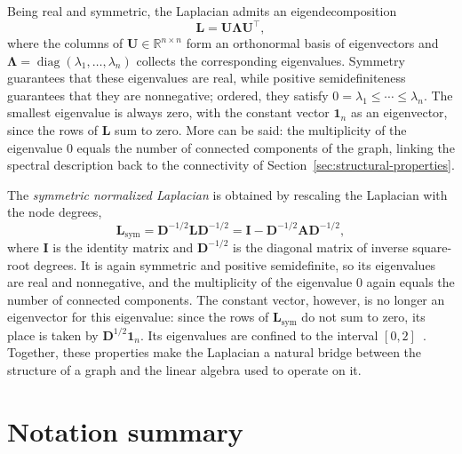 Being real and symmetric, the Laplacian admits an eigendecomposition
\begin{equation}
  \mathbf{L} = \mathbf{U} \boldsymbol{\Lambda} \mathbf{U}^\top,
  \label{eq:eigendecomposition}
\end{equation}
where the columns of $\mathbf{U} \in \mathbb{R}^{n \times n}$ form an
orthonormal basis of eigenvectors and
$\boldsymbol{\Lambda} = \operatorname{diag}(\lambda_1, \ldots, \lambda_n)$
collects the corresponding eigenvalues. Symmetry guarantees that these
eigenvalues are real, while positive semidefiniteness guarantees that they are
nonnegative; ordered, they satisfy
$0 = \lambda_1 \leq \cdots \leq \lambda_n$. The smallest eigenvalue is always
zero, with the constant vector $\mathbf{1}_{n}$ as an eigenvector, since the rows of
$\mathbf{L}$ sum to zero. More can be said: the multiplicity of the
eigenvalue $0$ equals the number of connected components of the graph,
linking the spectral description back to the connectivity of
Section~\ref{sec:structural-properties}.

The \textit{symmetric normalized Laplacian} is obtained by 
rescaling the Laplacian with the node degrees,
\begin{equation}
  \mathbf{L}_{\mathrm{sym}}
  = \mathbf{D}^{-1/2} \mathbf{L} \mathbf{D}^{-1/2}
  = \mathbf{I} - \mathbf{D}^{-1/2} \mathbf{A} \mathbf{D}^{-1/2},
  \label{eq:normalized-laplacian}
\end{equation}
where $\mathbf{I}$ is the identity matrix and $\mathbf{D}^{-1/2}$ is the
diagonal matrix of inverse square-root
degrees.
It is again symmetric and positive semidefinite, so its eigenvalues are real
and nonnegative, and the multiplicity of the eigenvalue $0$ again equals the
number of connected components. The constant vector, however, is no longer an
eigenvector for this eigenvalue: since the rows of $\mathbf{L}_{\mathrm{sym}}$
do not sum to zero, its place is taken by $\mathbf{D}^{1/2}\mathbf{1}_{n}$.
Its eigenvalues are confined to the interval $[0, 2]$~\cite{chung1997}.
Together, these properties make the Laplacian a natural bridge between the
structure of a graph and the linear algebra used to operate on it.

\FloatBarrier
\section{Notation summary}
\label{sec:notation-summary}


